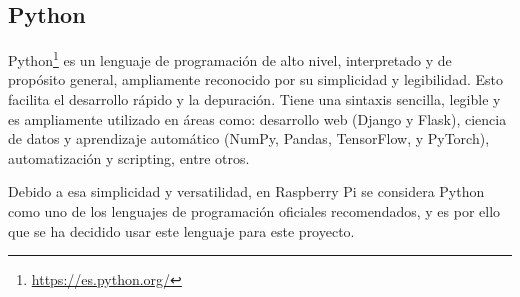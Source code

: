 \subsection{Python}
\label{subsec:python}

Python\footnote{\url{https://es.python.org/}} es un lenguaje de programación de alto nivel, interpretado y de propósito general, ampliamente reconocido por su simplicidad y legibilidad. Esto facilita el desarrollo rápido y la depuración. Tiene una sintaxis sencilla, legible y es ampliamente utilizado en áreas como: desarrollo web (Django y Flask), ciencia de datos y aprendizaje automático (NumPy, Pandas, TensorFlow, y PyTorch), automatización y scripting, entre otros.

Debido a esa simplicidad y versatilidad, en Raspberry Pi se considera Python como uno de los lenguajes de programación oficiales recomendados, y es por ello que se ha decidido usar este lenguaje para este proyecto.





